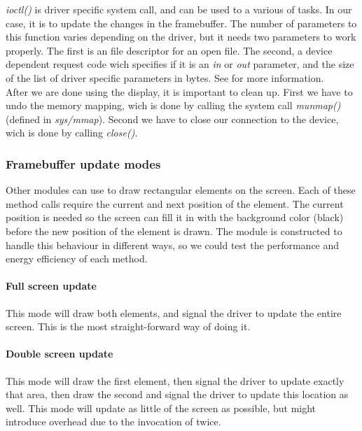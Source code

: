 \emph{ioctl()} is driver specific system call, and can be used to a various of tasks. In our case, it is to update the changes in the framebuffer. The number of parameters to this function varies depending on the driver, but it needs two parameters to work properly. The first is an file descriptor for an open file. The second, a device dependent request code wich specifies if it is an \emph{in} or \emph{out} parameter, and the size of the list of driver specific parameters in bytes. See \cite[ioctl]{linux_programmers_manual} for more information.   
\\

After we are done using the display, it is important to clean up. First we have to undo the memory mapping, wich is done by calling the system call \emph{munmap()} (defined in \emph{sys/mmap}). Second we have to close our connection to the device, wich is done by calling \emph{close()}.

\subsubsection{Framebuffer update modes}
\label{subsubsection:framebuffer-update-modes}
Other modules can use  to draw rectangular elements on the screen. Each of these method calls require the current and next position of the element. The current position is needed so the screen can fill it in with the background color (black) before the new position of the element is drawn. The module is constructed to handle this behaviour in different ways, so we could test the performance and energy efficiency of each method.

\paragraph{Full screen update}
This mode will draw both elements, and signal the driver to update the entire screen. This is the most straight-forward way of doing it.

\paragraph{Double screen update}
This mode will draw the first element, then signal the driver to update exactly that area, then draw the second and signal the driver to update this location as well. This mode will update as little of the screen as possible, but might introduce overhead due to the invocation of  twice.

